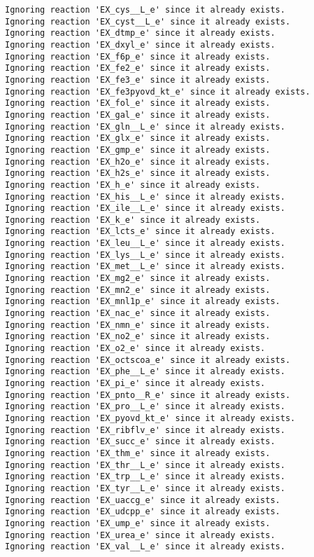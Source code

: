 \documentclass[
  letterpaper,
  DIV=11,
  numbers=noendperiod]{scrartcl}
\begin{document}
\begin{verbatim}
Ignoring reaction 'EX_cys__L_e' since it already exists.
Ignoring reaction 'EX_cyst__L_e' since it already exists.
Ignoring reaction 'EX_dtmp_e' since it already exists.
Ignoring reaction 'EX_dxyl_e' since it already exists.
Ignoring reaction 'EX_f6p_e' since it already exists.
Ignoring reaction 'EX_fe2_e' since it already exists.
Ignoring reaction 'EX_fe3_e' since it already exists.
Ignoring reaction 'EX_fe3pyovd_kt_e' since it already exists.
Ignoring reaction 'EX_fol_e' since it already exists.
Ignoring reaction 'EX_gal_e' since it already exists.
Ignoring reaction 'EX_gln__L_e' since it already exists.
Ignoring reaction 'EX_glx_e' since it already exists.
Ignoring reaction 'EX_gmp_e' since it already exists.
Ignoring reaction 'EX_h2o_e' since it already exists.
Ignoring reaction 'EX_h2s_e' since it already exists.
Ignoring reaction 'EX_h_e' since it already exists.
Ignoring reaction 'EX_his__L_e' since it already exists.
Ignoring reaction 'EX_ile__L_e' since it already exists.
Ignoring reaction 'EX_k_e' since it already exists.
Ignoring reaction 'EX_lcts_e' since it already exists.
Ignoring reaction 'EX_leu__L_e' since it already exists.
Ignoring reaction 'EX_lys__L_e' since it already exists.
Ignoring reaction 'EX_met__L_e' since it already exists.
Ignoring reaction 'EX_mg2_e' since it already exists.
Ignoring reaction 'EX_mn2_e' since it already exists.
Ignoring reaction 'EX_mnl1p_e' since it already exists.
Ignoring reaction 'EX_nac_e' since it already exists.
Ignoring reaction 'EX_nmn_e' since it already exists.
Ignoring reaction 'EX_no2_e' since it already exists.
Ignoring reaction 'EX_o2_e' since it already exists.
Ignoring reaction 'EX_octscoa_e' since it already exists.
Ignoring reaction 'EX_phe__L_e' since it already exists.
Ignoring reaction 'EX_pi_e' since it already exists.
Ignoring reaction 'EX_pnto__R_e' since it already exists.
Ignoring reaction 'EX_pro__L_e' since it already exists.
Ignoring reaction 'EX_pyovd_kt_e' since it already exists.
Ignoring reaction 'EX_ribflv_e' since it already exists.
Ignoring reaction 'EX_succ_e' since it already exists.
Ignoring reaction 'EX_thm_e' since it already exists.
Ignoring reaction 'EX_thr__L_e' since it already exists.
Ignoring reaction 'EX_trp__L_e' since it already exists.
Ignoring reaction 'EX_tyr__L_e' since it already exists.
Ignoring reaction 'EX_uaccg_e' since it already exists.
Ignoring reaction 'EX_udcpp_e' since it already exists.
Ignoring reaction 'EX_ump_e' since it already exists.
Ignoring reaction 'EX_urea_e' since it already exists.
Ignoring reaction 'EX_val__L_e' since it already exists.

\end{verbatim}
\end{document}
